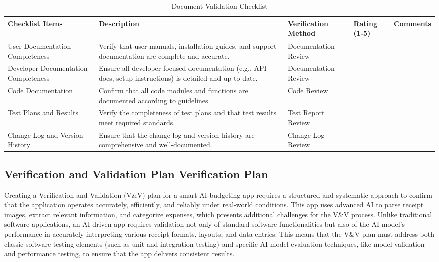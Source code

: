 \documentclass[12pt, titlepage]{article}
\begin{document}
\begin{table}[h!]
\caption{Document Validation Checklist}
\noindent \begin{tabular}{|>{\raggedright\arraybackslash}p{3cm}|>{\raggedright\arraybackslash}p{4cm}|>{\raggedright\arraybackslash}p{3cm}|p{1cm}|p{2.25cm}|}
	\hline
	\textbf{Checklist Items} & \textbf{Description} & \textbf{Verification Method} & \textbf{Rating (1-5)} & \textbf{Comments} \\ 
	\hline
	User Documentation Completeness	& Verify that user manuals, installation guides, and support documentation are complete and accurate. & Documentation Review & & \\
	\hline
	Developer Documentation Completeness & Ensure all developer-focused documentation (e.g., API docs, setup instructions) is detailed and up to date. & Documentation Review & & \\ 
	\hline
	Code Documentation & Confirm that all code modules and functions are documented according to guidelines. & Code Review & & \\
	\hline
	Test Plans and Results & Verify the completeness of test plans and that test results meet required standards. & Test Report Review & & \\
	\hline
	Change Log and Version History & Ensure that the change log and version history are comprehensive and well-documented. & Change Log Review & & \\ 
	\hline
\end{tabular}
\end{table}

\subsection{Verification and Validation Plan Verification Plan}

Creating a Verification and Validation (V\&V) plan for a smart AI budgeting app requires a structured and systematic approach to confirm that the application operates accurately, efficiently, and reliably under real-world conditions.
This app uses advanced AI to parse receipt images, extract relevant information, and categorize expenses, which presents additional challenges for the V\&V process.
Unlike traditional software applications, an AI-driven app requires validation not only of standard software functionalities but also of the AI model's performance in accurately interpreting various receipt formats, layouts, and data entries.
This means that the V\&V plan must address both classic software testing elements (such as unit and integration testing) and specific AI model evaluation techniques, like model validation and performance testing, to ensure that the app delivers consistent results. \\
\end{document}
